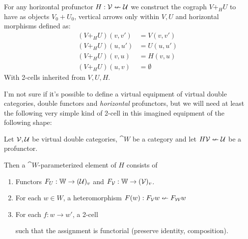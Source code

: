 \documentclass{article}
\begin{document}
\begin{definition}
  For any horizontal profunctor $H : \mathcal V \nleftarrow \mathcal U$ we
  construct the cograph $V +_{H} U$ to have as objects $V_0 + U_0$,
  vertical arrows only within $V,U$ and horizontal morphisms defined
  as:
  \begin{align*}
    (V +_{H} U)(v,v') &= V(v,v')\\
    (V +_{H} U)(u,u') &= U(u,u')\\
    (V +_{H} U)(v,u) &= H(v,u)\\
    (V +_{H} U)(u,v) &= \emptyset
  \end{align*}
  With 2-cells inherited from $V,U,H$.
\end{definition}

I'm not sure if it's possible to define a virtual equipment of virtual
double categories, double functors and \emph{horizontal} profunctors,
but we will need at least the following very simple kind of 2-cell in
this imagined equipment of the following shape:


\begin{definition}
  Let $\mathcal {V,U}$ be virtual double categories, $\cat W$ be a
  category and let $H \mathcal V \nleftarrow \mathcal U$ be a profunctor.

  Then a $\cat W$-parameterized element of $H$ consists of
  \begin{enumerate}
  \item Functors $F_U : \mathbb W \to (\mathcal U)_v$ and $F_{\mathcal V} :
    \mathbb W \to (\mathcal V)_v$.
  \item For each $w \in W$, a heteromorphism $F(w) : F_{\mathcal V} w
    \nleftarrow F_{\mathcal W} w$
  \item For each $f : w \to w'$, a 2-cell
    such that the assignment is functorial (preserve identity,
    composition).
  \end{enumerate}
\end{definition}
\end{document}
